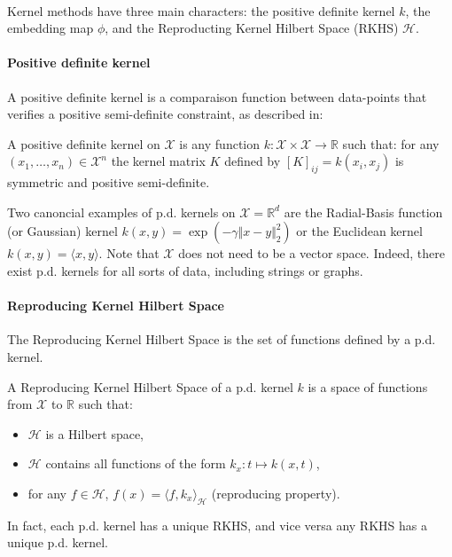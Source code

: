 \paragraph{}Kernel methods have three main characters: the positive definite kernel $k$, the embedding map $\phi$, and the Reproducting Kernel Hilbert Space (RKHS) $\mathcal H$.


\paragraph{Positive definite kernel} A positive definite kernel is a comparaison function between data-points that verifies a positive semi-definite constraint, as described in:
\begin{mdframed}
\begin{definition}
A positive definite kernel on $\mathcal X$ is any function $k: \mathcal X \times \mathcal X \to \mathbb R$ such that: for any $(x_1, \ldots, x_n)\in\mathcal X^n$ the kernel matrix $K$ defined by $[K]_{ij} = k(x_i, x_j)$ is symmetric and positive semi-definite.
\end{definition}
\end{mdframed}
Two canoncial examples of p.d. kernels on $\mathcal X = \mathbb R^d$ are the Radial-Basis function (or Gaussian) kernel $k(x, y) = \exp(-\gamma \Vert x - y \Vert_2^2)$ or the Euclidean kernel $k(x, y) = \langle x, y \rangle$. Note that $\mathcal X$ does not need to be a vector space. Indeed, there exist p.d. kernels for all sorts of data, including strings or graphs.

\paragraph{Reproducing Kernel Hilbert Space}
The Reproducing Kernel Hilbert Space is the set of functions defined by a p.d. kernel.
\begin{mdframed}
\begin{definition}
A Reproducing Kernel Hilbert Space of a p.d. kernel $k$ is a space of functions from $\mathcal X$ to $\mathbb R$ such that:
\begin{itemize}
\item $\mathcal H$ is a Hilbert space,
\item $\mathcal H$ contains all functions of the form $k_x: t\mapsto k(x, t)$,
\item for any $f\in\mathcal H$, $f(x) = \langle f, k_x\rangle_\mathcal H$ (reproducing property).
\end{itemize}
\end{definition}
\end{mdframed}
In fact, each p.d. kernel has a unique RKHS, and vice versa any RKHS has a unique p.d. kernel.\citep{aronjxan1950}

